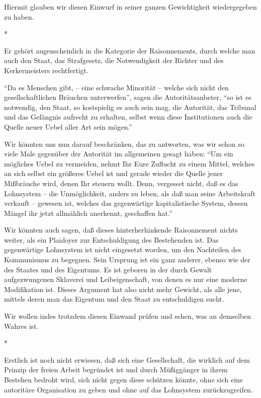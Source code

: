 \documentclass{scrbook}
\begin{document}
Hiermit glauben wir diesen Einwurf in seiner ganzen Gewichtigkeit wiedergegeben zu haben.

\begin{center}*\end{center}

Er gehört augenscheinlich in die Kategorie der Raisonnements, durch welche man auch den Staat, das Strafgesetz, die Notwendigkeit der Richter und des Kerkermeisters rechtfertigt.

``Da es Menschen gibt, – eine schwache Minorität – welche sich nicht den gesellschaftlichen Bräuchen unterwerfen'', sagen die Autoritätsanbeter, ``so ist es notwendig, den Staat, so kostspielig es auch sein mag, die Autorität, das Tribunal und das Gefängnis aufrecht zu erhalten, selbst wenn diese Institutionen auch die Quelle neuer Uebel aller Art sein mögen.''

Wir könnten uns nun darauf beschränken, das zu antworten, was wir schon so viele Male gegenüber der Autorität im allgemeinen gesagt haben: ``Um ein mögliches Uebel zu vermeiden, nehmt Ihr Eure Zuflucht zu einem Mittel, welches an sich selbst ein größeres Uebel ist und gerade wieder die Quelle jener Mißbräuche wird, denen Ihr steuern wollt. Denn, vergesset nicht, daß es das Lohnsystem – die Unmöglichkeit, anders zu leben, als daß man seine Arbeitskraft verkauft – gewesen ist, welches das gegenwärtige kapitalistische System, dessen Mängel ihr jetzt allmählich anerkennt, geschaffen hat.''

Wir könnten auch sagen, daß dieses hinterherhinkende Raisonnement nichts weiter, als ein Plaidoyer zur Entschuldigung des Bestehenden ist. Das gegenwärtige Lohnsystem ist nicht eingesetzt worden, um den Nachteilen des Kommunismus zu begegnen. Sein Ursprung ist ein ganz anderer, ebenso wie der des Staates und des Eigentums. Es ist geboren in der durch Gewalt aufgezwungenen Sklaverei und Leibeigenschaft, von denen es nur eine moderne Modifikation ist. Dieses Argument hat also nicht mehr Gewicht, als alle jene, mittels deren man das Eigentum und den Staat zu entschuldigen sucht.

Wir wollen indes trotzdem diesen Einwand prüfen und sehen, was an demselben Wahres ist.

\begin{center}*\end{center}

Erstlich ist noch nicht erwiesen, daß sich eine Gesellschaft, die wirklich auf dem Prinzip der freien Arbeit begründet ist und durch Müßiggänger in ihrem Bestehen bedroht wird, sich nicht gegen diese schützen könnte, ohne sich eine autoritäre Organisation zu geben und ohne auf das Lohnsystem zurückzugreifen.
\end{document}
